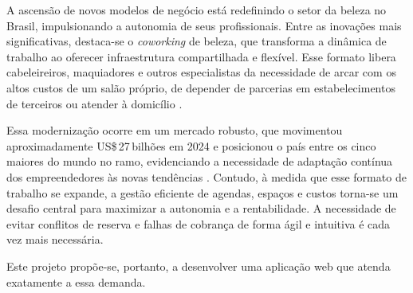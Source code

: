 
A ascensão de novos modelos de negócio está redefinindo o setor da beleza no Brasil, impulsionando a autonomia de seus profissionais. Entre as inovações mais significativas, destaca-se o \emph{coworking} de beleza, que transforma a dinâmica de trabalho ao oferecer infraestrutura compartilhada e flexível. Esse formato libera cabeleireiros, maquiadores e outros especialistas da necessidade de arcar com os altos custos de um salão próprio, de depender de parcerias em estabelecimentos de terceiros ou atender à domicílio \cite{BeautyFair, gazeta-coworking}. 

Essa modernização ocorre em um mercado robusto, que movimentou aproximadamente US\$\,27\,bilhões em 2024 e posicionou o país entre os cinco maiores do mundo no ramo, evidenciando a necessidade de adaptação contínua dos empreendedores às novas tendências \cite{Sebrae_2024}. Contudo, à medida que esse formato de trabalho se expande, a gestão eficiente de agendas, espaços e custos torna-se um desafio central para maximizar a autonomia e a rentabilidade. A necessidade de evitar conflitos de reserva e falhas de cobrança de forma ágil e intuitiva é cada vez mais necessária.

Este projeto propõe-se, portanto, a desenvolver uma aplicação web que atenda exatamente a essa demanda.





